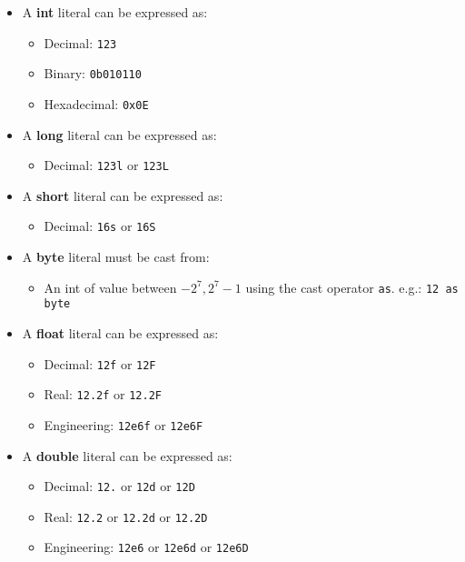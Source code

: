 \documentclass[conc-doc]{subfiles}
\begin{document}
\begin{itemize}
	\item A \textbf{int} literal can be expressed as:
	\begin{itemize}
		\item Decimal: \lstinline{123}
		\item Binary: \lstinline{0b010110}
		\item Hexadecimal: \lstinline{0x0E}
	\end{itemize}

	\item A \textbf{long} literal can be expressed as:
	\begin{itemize}
		\item Decimal: \lstinline{123l} or \lstinline{123L}
	\end{itemize}

	\item A \textbf{short} literal can be expressed as:
	\begin{itemize}
		\item Decimal: \lstinline{16s} or \lstinline{16S}
	\end{itemize}

	\item A \textbf{byte} literal must be cast from:
	\begin{itemize}
		\item An int of value between ${-2^7, 2^7 - 1}$ using the cast operator \lstinline{as}. e.g.: \lstinline{12 as byte}
	\end{itemize}

	\item A \textbf{float} literal can be expressed as:
	\begin{itemize}
		\item Decimal: \lstinline{12f} or \lstinline{12F}
		\item Real: \lstinline{12.2f} or \lstinline{12.2F}
		\item Engineering: \lstinline{12e6f} or \lstinline{12e6F}
	\end{itemize}

	\item A \textbf{double} literal can be expressed as:
	\begin{itemize}
		\item Decimal: \lstinline{12.} or \lstinline{12d} or \lstinline{12D}
		\item Real: \lstinline{12.2} or \lstinline{12.2d} or \lstinline{12.2D}
		\item Engineering: \lstinline{12e6} or \lstinline{12e6d} or \lstinline{12e6D}
	\end{itemize}

\end{itemize}
\end{document}

